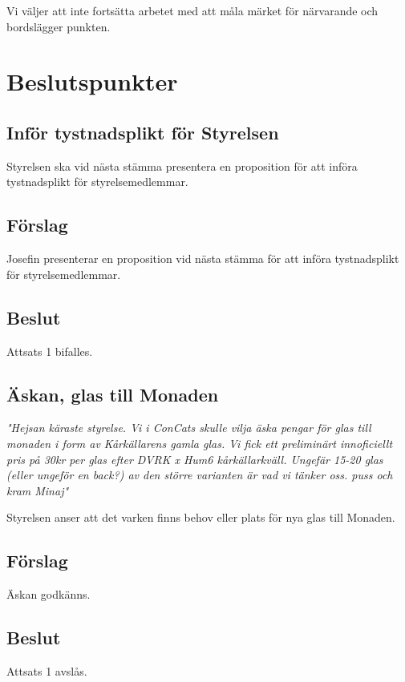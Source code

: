 \documentclass[protokoll]{dvd}
\begin{document}
Vi väljer att inte fortsätta arbetet med att måla märket för närvarande och bordslägger punkten. 
\newpage

\section{Beslutspunkter}
\subsection*{Inför tystnadsplikt för Styrelsen}
Styrelsen ska vid nästa stämma presentera en proposition för att införa tystnadsplikt för styrelsemedlemmar.

\subsection{Förslag}
\begin{attsatser}
  \item Josefin presenterar en proposition vid nästa stämma för att införa tystnadsplikt för styrelsemedlemmar.
\end{attsatser}
\subsection{Beslut}
Attsats 1 bifalles.

\subsection*{Äskan, glas till Monaden}
\textit{"Hejsan käraste styrelse.
Vi i ConCats skulle vilja äska pengar för glas till monaden i form av Kårkällarens gamla glas. Vi fick ett preliminärt innoficiellt pris på 30kr per glas efter DVRK x Hum6 kårkällarkväll. Ungefär 15-20 glas (eller ungeför en back?) av den större varianten är vad vi tänker oss.
puss och kram
Minaj"}


Styrelsen anser att det varken finns behov eller plats för nya glas till Monaden.
\subsection{Förslag}
\begin{attsatser}
    \item Äskan godkänns.
\end{attsatser}
\subsection{Beslut}
Attsats 1 avslås.
\subsection*{}
\end{document}

